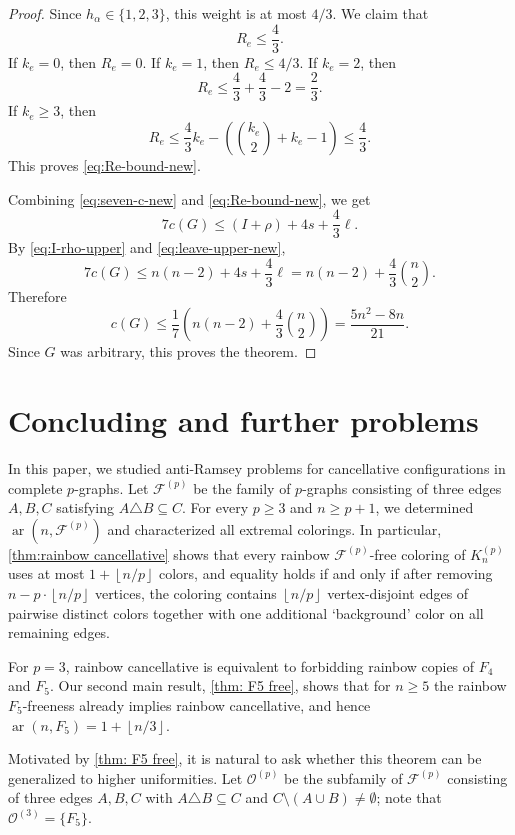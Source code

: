 \documentclass[10pt,a4paper]{article}
\theoremstyle{definition}
\newcommand{\cF}{\mathcal{F}}
\newcommand{\cO}{\mathcal{O}}
\newcommand{\floor}[1]{\left\lfloor #1 \right\rfloor}
\DeclareMathOperator{\ar}{ar}
\begin{document}
\begin{proof}
    Since $h_\alpha\in\{1,2,3\}$, this weight is at most $4/3$.
    We claim that
    \begin{equation}\label{eq:Re-bound-new}
        R_e\le \frac{4}{3}.
    \end{equation}
    If $k_e=0$, then $R_e=0$.  If $k_e=1$, then $R_e\le4/3$.  If $k_e=2$,
    then
    \[
        R_e\le \frac{4}{3}+\frac{4}{3}-2=\frac23.
    \]
    If $k_e\ge3$, then
    \[
        R_e
        \le
        \frac{4}{3} k_e-\left(\binom{k_e}{2}+k_e-1\right)
        \le \frac{4}{3}.
    \]
    This proves \eqref{eq:Re-bound-new}.

    Combining \eqref{eq:seven-c-new} and \eqref{eq:Re-bound-new}, we get
    \[
        7c(G)\le (I+\rho)+4s+\frac{4}{3}\ell.
    \]
    By \eqref{eq:I-rho-upper} and \eqref{eq:leave-upper-new},
    \[
        7c(G)
        \le
        n(n-2)+4s+\frac{4}{3}\ell
        =
        n(n-2)+\frac{4}{3}\binom n2.
    \]
    Therefore
    \[
        c(G)
        \le
        \frac17\left(n(n-2)+\frac{4}{3}\binom n2\right)
        =
        \frac{5n^2-8n}{21}.
    \]
    Since $G$ was arbitrary, this proves the theorem.
\end{proof}



\section{Concluding and further problems}\label{sec:concluding}
In this paper, we studied anti-Ramsey problems for cancellative configurations in complete $p$-graphs.
Let $\cF^{(p)}$ be the family of $p$-graphs consisting of three edges $A,B,C$ satisfying $A\triangle B\subseteq C$.
For every $p\ge3$ and $n\ge p+1$, we determined $\ar(n,\cF^{(p)})$ and characterized all extremal colorings.
In particular, \cref{thm:rainbow cancellative} shows that every rainbow $\cF^{(p)}$-free coloring of $K_n^{(p)}$ uses at most $1+\floor{n/p}$ colors, and equality holds if and only if after removing $n-p\cdot\floor{n/p}$ vertices,
the coloring contains $\floor{n/p}$ vertex-disjoint edges of pairwise distinct colors together with one additional `background' color on all remaining edges.

For $p=3$, rainbow cancellative is equivalent to forbidding rainbow copies of $F_4$ and $F_5$.
Our second main result, \cref{thm: F5 free}, shows that for $n\ge5$ the rainbow $F_5$-freeness already implies rainbow cancellative, and hence $\ar(n,F_5)=1+\floor{n/3}$.

Motivated by \cref{thm: F5 free}, it is natural to ask whether this theorem can be generalized to higher uniformities.
Let $\cO^{(p)}$ be the subfamily of $\cF^{(p)}$ consisting of three edges $A,B,C$ with $A\triangle B\subseteq C$ and $C\setminus (A\cup B)\neq\emptyset$; note that $\cO^{(3)}=\{F_5\}$.
\end{document}
